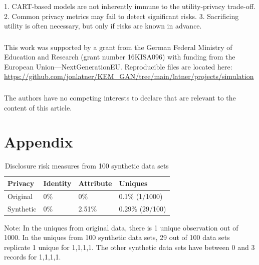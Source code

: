 \documentclass[runningheads]{llncs}
\begin{document}
    1.  CART-based models are not inherently immune to the utility-privacy trade-off.
    2.  Common privacy metrics may fail to detect significant risks.
    3.  Sacrificing utility is often necessary, but only if risks are known in advance.


\begin{credits}
\subsubsection{\ackname} This work was supported by a grant from the German Federal Ministry of Education and Research (grant number 16KISA096) with funding from the European Union—NextGenerationEU.  Reproducible files are located here: \url{https://github.com/jonlatner/KEM\_GAN/tree/main/latner/projects/simulation}

\subsubsection{\discintname}
The authors have no competing interests to declare that are relevant to the content of this article.
\end{credits}





\clearpage
\appendix
\section{Appendix}\label{appendix}
\setcounter{figure}{0}    
\setcounter{table}{0}    
\renewcommand*\thetable{\Alph{section}.\arabic{table}}
\renewcommand*\thefigure{\Alph{section}.\arabic{figure}}
\renewcommand{\theHfigure}{\Alph{section}.\arabic{table}}
\renewcommand{\theHtable}{\Alph{section}.\arabic{figure}}

\begin{table}[]
    \centering
    \caption{Disclosure risk measures from 100 synthetic data sets}
    \begin{tabular}{llll}
        \toprule
        Privacy   & Identity & Attribute & Uniques \\ \midrule
        Original  & 0\%      & 0\%       & 0.1\% (1/1000) \\
        Synthetic & 0\%      & 2.51\%       & 0.29\% (29/100)  \\ 
        \bottomrule
    \end{tabular}
    \label{table:disclosure_risk_100}
    \vspace{0.5em} %
    \noindent\parbox{0.8\textwidth}{\footnotesize  Note: In the uniques from original data, there is 1 unique observation out of 1000.  In the uniques from 100 synthetic data sets, 29 out of 100 data sets replicate 1 unique for 1,1,1,1. The other synthetic data sets have between 0 and 3 records for 1,1,1,1.}
\end{table}
\end{document}
